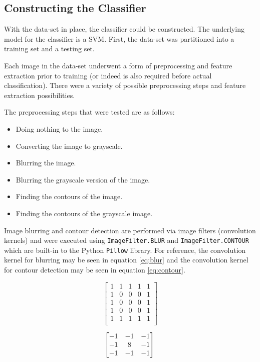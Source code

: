 \documentclass[letterpaper, 10 pt, conference]{conf/ieeeconf}  %
\begin{document}
\subsection{Constructing the Classifier} %
With the data-set in place, the classifier could be constructed. The underlying
model for the classifier is a SVM. First, the data-set was partitioned into a
training set and a testing set.

Each image in the data-set underwent a form of preprocessing and feature
extraction prior to training (or indeed is also required before actual
classification). There were a variety of possible preprocessing steps and
feature extraction possibilities.

The preprocessing steps that were tested are as follows:
\begin{itemize}
\item Doing nothing to the image.
\item Converting the image to grayscale.
\item Blurring the image.
\item Blurring the grayscale version of the image.
\item Finding the contours of the image.
\item Finding the contours of the grayscale image.
\end{itemize}

Image blurring and contour detection are performed via image filters
(convolution kernels) and were executed using \texttt{ImageFilter.BLUR} and
\texttt{ImageFilter.CONTOUR} which are built-in to the Python \texttt{Pillow}
library. For reference, the convolution kernel for blurring may be seen in
equation \eqref{eq:blur} and the convolution kernel for contour detection may be
seen in equation \eqref{eq:contour}.

\noindent\begin{minipage}{.5\linewidth}
  \begin{equation}
    \begin{bmatrix}
      1 & 1 & 1 & 1 & 1\\
      1 & 0 & 0 & 0 & 1\\
      1 & 0 & 0 & 0 & 1\\
      1 & 0 & 0 & 0 & 1\\
      1 & 1 & 1 & 1 & 1\\
    \end{bmatrix}
    \label{eq:blur}
  \end{equation}
\end{minipage}%
\begin{minipage}{.5\linewidth}
  \begin{equation}
    \begin{bmatrix}
      -1 & -1 & -1\\
      -1 &  8 & -1\\
      -1 & -1 & -1\\
    \end{bmatrix}\\
    \label{eq:contour}
  \end{equation}
\end{minipage}\\
\end{document}
